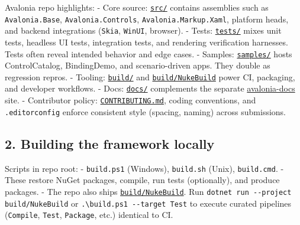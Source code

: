 Avalonia repo highlights: - Core source:
\href{https://github.com/AvaloniaUI/Avalonia/tree/master/src}{\passthrough{\lstinline!src/!}}
contains assemblies such as \passthrough{\lstinline!Avalonia.Base!},
\passthrough{\lstinline!Avalonia.Controls!},
\passthrough{\lstinline!Avalonia.Markup.Xaml!}, platform heads, and
backend integrations (\passthrough{\lstinline!Skia!},
\passthrough{\lstinline!WinUI!}, browser). - Tests:
\href{https://github.com/AvaloniaUI/Avalonia/tree/master/tests}{\passthrough{\lstinline!tests/!}}
mixes unit tests, headless UI tests, integration tests, and rendering
verification harnesses. Tests often reveal intended behavior and edge
cases. - Samples:
\href{https://github.com/AvaloniaUI/Avalonia/tree/master/samples}{\passthrough{\lstinline!samples/!}}
hosts ControlCatalog, BindingDemo, and scenario-driven apps. They double
as regression repros. - Tooling:
\href{https://github.com/AvaloniaUI/Avalonia/tree/master/build}{\passthrough{\lstinline!build/!}}
and
\href{https://github.com/AvaloniaUI/Avalonia/tree/master/build/NukeBuild}{\passthrough{\lstinline!build/NukeBuild!}}
power CI, packaging, and developer workflows. - Docs:
\href{https://github.com/AvaloniaUI/Avalonia/tree/master/docs}{\passthrough{\lstinline!docs/!}}
complements the separate
\href{https://github.com/AvaloniaUI/avalonia-docs}{avalonia-docs} site.
- Contributor policy:
\href{https://github.com/AvaloniaUI/Avalonia/blob/master/CONTRIBUTING.md}{\passthrough{\lstinline!CONTRIBUTING.md!}},
coding conventions, and \passthrough{\lstinline!.editorconfig!} enforce
consistent style (spacing, naming) across submissions.

\subsection{2. Building the framework
locally}\label{building-the-framework-locally}

Scripts in repo root: - \passthrough{\lstinline!build.ps1!} (Windows),
\passthrough{\lstinline!build.sh!} (Unix),
\passthrough{\lstinline!build.cmd!}. - These restore NuGet packages,
compile, run tests (optionally), and produce packages. - The repo also
ships
\href{https://github.com/AvaloniaUI/Avalonia/tree/master/build/NukeBuild}{\passthrough{\lstinline!build/NukeBuild!}}.
Run \passthrough{\lstinline!dotnet run --project build/NukeBuild!} or
\passthrough{\lstinline!.\\build.ps1 --target Test!} to execute curated
pipelines (\passthrough{\lstinline!Compile!},
\passthrough{\lstinline!Test!}, \passthrough{\lstinline!Package!}, etc.)
identical to CI.

